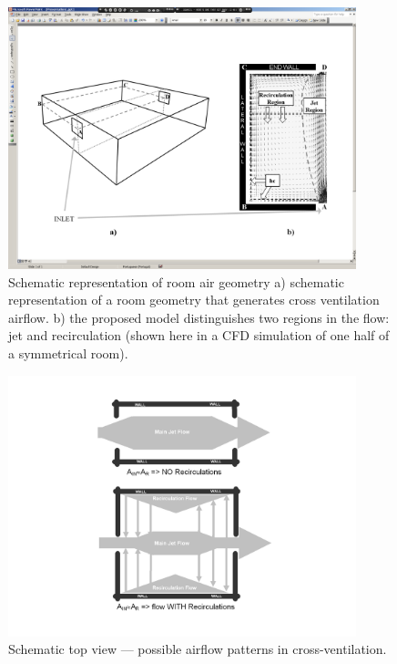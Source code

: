 \begin{figure}[hbtp] %
\centering
\includegraphics[width=0.9\textwidth, height=0.9\textheight, keepaspectratio=true]{media/image081.png}
\caption{Schematic representation of room air geometry a) schematic representation of a room geometry that generates cross ventilation airflow. b) the proposed model distinguishes two regions in the flow: jet and recirculation (shown here in a CFD simulation of one half of a symmetrical room). \protect \label{fig:schematic-representation-of-room-air-geometry}}
\end{figure}

\begin{figure}[hbtp] %
\centering
\includegraphics[width=0.9\textwidth, height=0.9\textheight, keepaspectratio=true]{media/image082.png}
\caption{Schematic top view --- possible airflow patterns in cross-ventilation. \protect \label{fig:schematic-top-view-possible-airflow-patterns}}
\end{figure}

